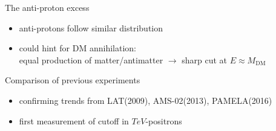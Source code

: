 \documentclass[11pt,a4paper,titlepage]{beamer}
\begin{document}
\begin{frame}{The anti-proton excess}
\begin{minipage}{\textwidth}
\centering
\end{minipage}
\begin{minipage}{\textwidth}
\begin{itemize}
\item anti-protons follow similar distribution\medskip
\item could hint for DM annihilation:\\
equal production of matter/antimatter $\rightarrow$ sharp cut at $E\approx M_\text{DM}$
\end{itemize}
\end{minipage}
\end{frame}
\begin{frame}{Comparison of previous experiments}
\begin{minipage}{\textwidth}
\centering
\end{minipage}\vfill
\begin{minipage}{\textwidth}
\begin{itemize}
\item confirming trends from LAT(2009), AMS-02(2013), PAMELA(2016) \medskip
\item first measurement of cutoff in $\si{TeV}$-positrons
\end{itemize}
\end{minipage}
\end{frame}
\end{document}
